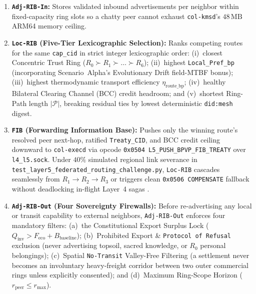 \begin{enumerate}
    \item \textbf{\texttt{Adj-RIB-In}:} Stores validated inbound advertisements per neighbor within
    fixed-capacity ring slots so a chatty peer cannot exhaust \texttt{col-kmsd}'s $48\,\mathrm{MB}$
    ARM64 memory ceiling.
    \item \textbf{\texttt{Loc-RIB} (Five-Tier Lexicographic Selection):} Ranks competing routes for
    the same \texttt{cap\_cid} in strict integer lexicographic order: (i)~closest Concentric Trust
    Ring ($R_0 \succ R_1 \succ \dots \succ R_6$); (ii)~highest \texttt{Local\_Pref\_bp} (incorporating
    Scenario~Alpha's Evolutionary Drift field-MTBF bonus); (iii)~highest thermodynamic transport
    efficiency $\eta_{\mathrm{route\_bp}}$; (iv)~healthy Bilateral Clearing Channel (BCC) credit
    headroom; and (v)~shortest Ring-Path length $|\mathcal{P}|$, breaking residual ties by lowest
    deterministic \texttt{did:mesh} digest.
    \item \textbf{\texttt{FIB} (Forwarding Information Base):} Pushes only the winning route's
    resolved peer next-hop, ratified \texttt{Treaty\_CID}, and BCC credit ceiling downward to
    \texttt{col-execd} via opcode \texttt{0x0504 L5\_PUSH\_BPVP\_FIB\_TREATY} over \texttt{l4\_l5.sock}.
    Under $40\%$ simulated regional link severance in \texttt{test\_layer5\_federated\_routing\_challenge.py},
    \texttt{Loc-RIB} cascades seamlessly from $R_1 \to R_2 \to R_3$ or triggers clean
    \texttt{0x0506 COMPENSATE} fallback without deadlocking in-flight Layer~4 sagas
    \parencite{garciamolina1987sagas}.
    \item \textbf{\texttt{Adj-RIB-Out} (Four Sovereignty Firewalls):} Before re-advertising any
    local or transit capability to external neighbors, \texttt{Adj-RIB-Out} enforces four mandatory
    filters: (a)~the Constitutional Export Surplus Lock ($Q_{\mathrm{inv}} > F_{\mathrm{eco}} + B_{\mathrm{baseline}}$);
    (b)~Prohibited Export \& \texttt{Protocol of Refusal} exclusion (never advertising topsoil,
    sacred knowledge, or $R_0$ personal belongings); (c)~Spatial \texttt{No-Transit} Valley-Free
    Filtering (a settlement never becomes an involuntary heavy-freight corridor between two outer
    commercial rings unless explicitly consented); and (d)~Maximum Ring-Scope Horizon
    ($r_{\mathrm{peer}} \le r_{\max}$).
\end{enumerate}

